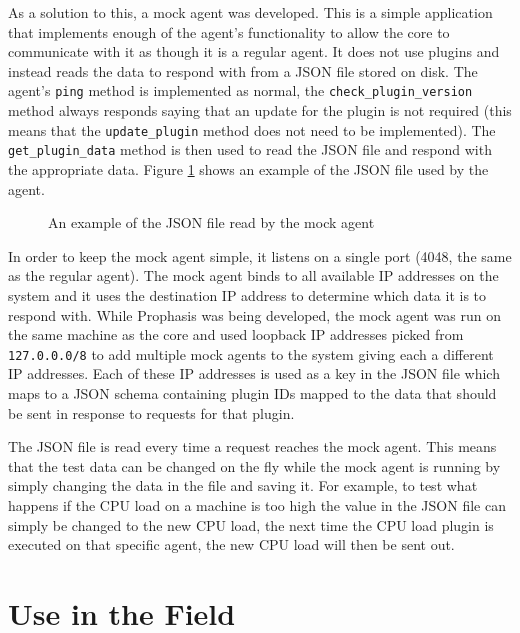 \documentclass[bsc,deptreport,twoside,parskip,singlespacing,notimes]{infthesis}
\begin{document}
	As a solution to this, a mock agent was developed.  This is a simple application
	that implements enough of the agent's functionality to allow the core to
	communicate with it as though it is a regular agent.  It does not use plugins
	and instead reads the data to respond with from a JSON file stored on disk. The
	agent's \texttt{ping} method is implemented as normal, the
	\texttt{check\_plugin\_version} method always responds saying that an update for
	the plugin is not required (this means that the \texttt{update\_plugin} method does
	not need to be implemented).  The \texttt{get\_plugin\_data} method is then
	used to read the JSON file and respond with the appropriate data. Figure
	\ref{mock-agent-data} shows an example of the JSON file used by the agent.

\begin{figure}[H]
	\caption{An example of the JSON file read by the mock agent}
	\label{mock-agent-data}
	
\end{figure}


	In order to keep the mock agent simple, it listens on a single port (4048, the
	same as the regular agent).  The mock agent binds to all available IP addresses
	on the system and it uses the destination IP address to determine which data it
	is to respond with.  While Prophasis was being developed, the mock agent was
	run on the same machine
	as the core and used loopback IP addresses picked from \texttt{127.0.0.0/8} to
	add multiple mock agents to the system giving each a different IP addresses.
	Each of these IP addresses is used as a key in the JSON file which maps to a
	JSON schema containing plugin IDs mapped to the data that should be sent in
	response to requests for that plugin.


	The JSON file is read every time a request reaches the mock agent.  This means
	that the test data can be changed on the fly while the mock agent is running by
	simply changing the data in the file and saving it.  For example, to test what
	happens if the CPU load on a machine is too high the value in the JSON file can
	simply be changed to the new CPU load, the next time the CPU
	load plugin is executed on that specific agent, the new CPU load will then be
	sent out.

\section{Use in the Field}
\end{document}

